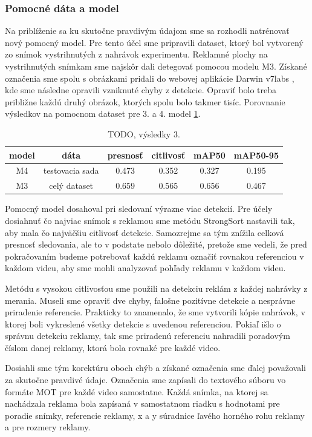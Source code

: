 \subsubsection{Pomocné dáta a model}

Na priblíženie sa ku skutočne pravdivým údajom sme sa rozhodli natrénovať nový pomocný model. Pre tento účel sme pripravili dataset, ktorý bol vytvorený zo snímok vystrihnutých z nahrávok experimentu. Reklamné plochy na vystrihnutých snímkam sme najskôr dali detegovať pomocou modelu M3. Získané označenia sme spolu s obrázkami pridali do webovej aplikácie Darwin v7labs \cite{v7}, kde sme následne opravili vzniknuté chyby z detekcie. Opraviť bolo treba približne každú druhý obrázok, ktorých spolu bolo takmer tisíc. Porovnanie výsledkov na pomocnom dataset pre 3. a 4. model \ref{table:test3}.
\\
\begin{table}[ht]
\centering
\begin{tabular}{ |c c c c c c| }
\hline
model & dáta & presnosť & citlivosť & mAP50 & mAP50-95 \\ 
\hline
M4 & testovacia sada & 0.473	& 0.352	& 0.327	& 0.195 \\
M3 & celý dataset & 0.659 & 0.565 & 0.656 & 0.467 \\
\hline
\end{tabular}
\caption{TODO, výsledky 3.}
\label{table:test3}
\end{table}

Pomocný model dosahoval pri sledovaní výrazne viac detekcií. Pre účely dosiahnuť čo najviac snímok s reklamou sme metódu StrongSort nastavili tak, aby mala čo najväčšiu citlivosť detekcie. Samozrejme sa tým znížila celková presnosť sledovania, ale to v podstate nebolo dôležité, pretože sme vedeli, že pred pokračovaním budeme potrebovať každú reklamu označiť rovnakou referenciou v každom videu, aby sme mohli analyzovať pohľady reklamu v každom videu.

Metódu s vysokou citlivosťou sme použili na detekciu reklám z každej nahrávky z merania. Museli sme opraviť dve chyby, falošne pozitívne detekcie a nesprávne priradenie referencie. Prakticky to znamenalo, že sme vytvorili kópie nahrávok, v ktorej boli vykreslené všetky detekcie s uvedenou referenciou. Pokiaľ išlo o správnu detekciu reklamy, tak sme priradenú referenciu nahradili poradovým číslom danej reklamy, ktorá bola rovnaké pre každé video. 

Dosiahli sme tým korektúru oboch chýb a získané označenia sme ďalej považovali za skutočne pravdivé údaje. Označenia sme zapísali do textového súboru vo formáte MOT pre každé video samostatne. Každá snímka, na ktorej sa nachádzala reklama bola zapísaná v samostatnom riadku s hodnotami pre poradie snímky, referencie reklamy, x a y súradnice ľavého horného rohu reklamy a pre rozmery reklamy.

